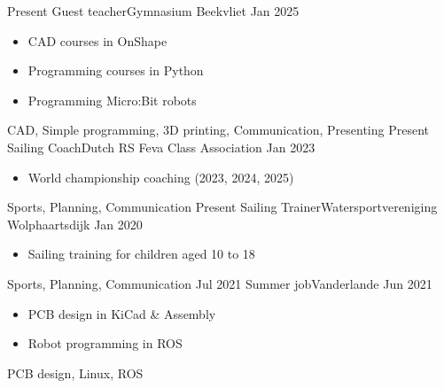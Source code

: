 %
%
%

\begin{experiences}
  \experience
        {Present}  {Guest teacher}{Gymnasium Beekvliet}
        {Jan 2025} {
                    \begin{itemize}
                        \item CAD courses in OnShape
                        \item Programming courses in Python
                        \item Programming Micro:Bit robots
                    \end{itemize}
                    }
                    {CAD, Simple programming, 3D printing, Communication, Presenting}
  \emptySeparator
  \experience
        {Present}  {Sailing Coach}{Dutch RS Feva Class Association}
        {Jan 2023} {
                    \begin{itemize}
                        \item World championship coaching (2023, 2024, 2025)
                    \end{itemize}
                    }
                    {Sports, Planning, Communication}
  \emptySeparator
  \experience
        {Present}  {Sailing Trainer}{Watersportvereniging Wolphaartsdijk}
        {Jan 2020} {
                    \begin{itemize}
                        \item Sailing training for children aged 10 to 18
                    \end{itemize}
                    }
                    {Sports, Planning, Communication}
  \emptySeparator
  \experience
        {Jul 2021} {Summer job}{Vanderlande}
        {Jun 2021} {
                    \begin{itemize}
                        \item PCB design in KiCad \& Assembly
                        \item Robot programming in ROS
                    \end{itemize}
                    }
                    {PCB design, Linux, ROS}
\end{experiences}
